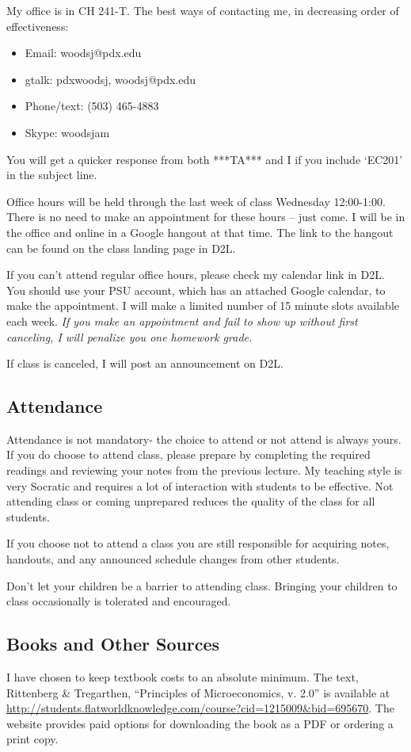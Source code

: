 \documentclass[letterpaper,10pt]{article}
\newcommand{\Office}{Wednesday 12:00-1:00}
\begin{document}
My office is in CH 241-T.  The best ways of contacting me, in
decreasing order of effectiveness:
\begin{itemize}
\item Email: woodsj@pdx.edu 
\item gtalk: pdxwoodsj, woodsj@pdx.edu
\item Phone/text: (503) 465-4883
\item Skype: woodsjam
\end{itemize}


You will get a quicker response from both ***TA*** and I if you include `EC201' in the subject line.

Office hours will be held through the last week of class \Office.
There is no need to make an appointment for these hours -- just come.
I will be in the office and online in a Google hangout at that time.  The link to the hangout can be found on the class landing page in D2L.

If you can't attend regular office hours, please check my calendar link in D2L. You should use your PSU account, which has an attached Google calendar, to make the appointment.  I will make a limited number of 15 minute slots available each week.  \emph{If you make an appointment and fail
  to show up without first canceling, I will penalize you one homework
  grade.}

If class is canceled, I will post an announcement on D2L.

\subsection{Attendance}

Attendance is not mandatory- the choice to attend or not attend is
always yours. If you do choose to attend class, please prepare by
completing the required readings and reviewing your notes from the
previous lecture. My teaching style is very Socratic and requires a
lot of interaction with students to be effective. Not attending class
or coming unprepared reduces the quality of the class for all
students.

If you choose not to attend a class you are still responsible for
acquiring notes, handouts, and any announced schedule changes from
other students. 

Don't let your children be a barrier to attending class. Bringing your
children to class occasionally is tolerated and encouraged.

\subsection{Books and Other Sources}
I have chosen to keep textbook costs to an absolute minimum.  The text, Rittenberg \& Tregarthen, ``Principles of Microeconomics, v. 2.0'' is available at \url{http://students.flatworldknowledge.com/course?cid=1215009&bid=695670}.  The website provides paid options for downloading the book as a PDF or ordering a print copy.
\end{document}
